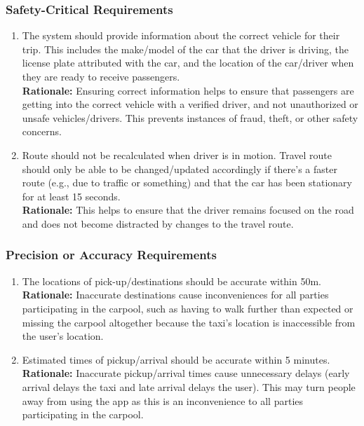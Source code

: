 \documentclass[]{article}
\begin{document}
\subsubsection{Safety-Critical Requirements}
\label{ssub:safety_critical_requirements}
\begin{enumerate}[{PR-SC}1. ]
	\item The system should provide information about the correct vehicle for their trip. This includes the make/model of the car that the driver is driving, the license plate attributed with the car, and the location of the car/driver when they are ready to receive passengers.\\
	{\bf Rationale:} Ensuring correct information helps to ensure that passengers are getting into the correct vehicle with a verified driver, and not unauthorized or unsafe vehicles/drivers. This prevents instances of fraud, theft, or other safety concerns. 
	\item Route should not be recalculated when driver is in motion. Travel route should only be able to be changed/updated accordingly if there's a faster route (e.g., due to traffic or something) and that the car has been stationary for at least 15 seconds.\\
	{\bf Rationale:} This helps to ensure that the driver remains focused on the road and does not become distracted by changes to the travel route. 
\end{enumerate}

\subsubsection{Precision or Accuracy Requirements}
\label{ssub:precision_or_accuracy_requirements}
\begin{enumerate}[{PR-PA}1. ]
	\item The locations of pick-up/destinations should be accurate within 50m.\\
	{\bf Rationale:} Inaccurate destinations cause inconveniences for all parties participating in the carpool, such as having to walk further than expected or missing the carpool altogether because the taxi's location is inaccessible from the user's location. 
	\item Estimated times of pickup/arrival should be accurate within 5 minutes.\\
	{\bf Rationale:} Inaccurate pickup/arrival times cause unnecessary delays (early arrival delays the taxi and late arrival delays the user). This may turn people away from using the app as this is an inconvenience to all parties participating in the carpool. 
\end{enumerate}
\end{document}
